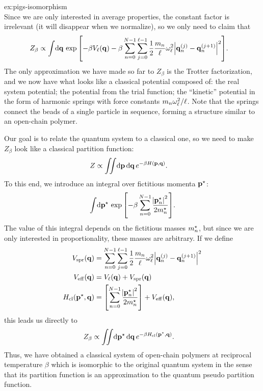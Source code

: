 \begin{DefAnswer}{ex:pigs-isomorphism}
\begin{subequations}
\end{subequations}
	Since we are only interested in average properties, the constant factor is irrelevant (it will disappear when we normalize), so we only need to claim that
	\begin{align}
		Z_\beta
		&\propto
			\int\! \dif \vec{q} \,
				\expb{
					-\beta V_\links(\vec{q})
					- \beta \sum_{n=0}^{N-1} \sum_{j=0}^{\links - 1}
						\frac{1}{2} \frac{m_n}{\links} \omega_\links^2 \abs{\vec{q}_n\bead{j} - \vec{q}_n\bead{j+1}}^2
				}.
	\end{align}
	The only approximation we have made so far to $Z_\beta$ is the Trotter factorization, and we now have what looks like a classical potential composed of: the real system potential; the potential from the trial function; the ``kinetic'' potential in the form of harmonic springs with force constants $m_n \omega_\ell^2 / \ell$.
	Note that the springs connect the beads of a single particle in sequence, forming a structure similar to an open-chain polymer.

	Our goal is to relate the quantum system to a classical one, so we need to make $Z_\beta$ look like a classical partition function:
	\begin{align}
		Z
		&\propto \iint\! \dif \vec{p} \dif \vec{q} \, e^{-\beta H(\vec{p}, \vec{q})}.
	\end{align}
	To this end, we introduce an integral over fictitious momenta ${\bm{\mathbf{p}}}^\star$:
	\begin{align}
		\int\! \dif \fict{\vec{p}} \, \expb{-\beta \sum_{n=0}^{N-1} \frac{\abs{\fict{\vec{p}}_n}^2}{2 \fict{m}_n}}.
	\end{align}
	The value of this integral depends on the fictitious masses ${m}^\star_n$, but since we are only interested in proportionality, these masses are arbitrary.
	If we define
	\begin{subequations} \label{eq:classical-equations}
	\begin{align}
		V_\mathrm{spr}(\bm{\mathbf{q}})
		&= \sum_{n=0}^{N-1} \sum_{j=0}^{\ell - 1}
			\frac{1}{2} \frac{m_n}{\ell} \omega_\ell^2
			\abs{\bm{\mathbf{q}}_n^{(j)} - \bm{\mathbf{q}}_n^{(j+1)}}^2
				\label{eq:classical-potential-spring} \\
		V_\mathrm{eff}(\bm{\mathbf{q}})
		&= V_\ell(\bm{\mathbf{q}}) + V_\mathrm{spr}(\bm{\mathbf{q}})
				\label{eq:classical-potential} \\
		H_\mathrm{cl}({\bm{\mathbf{p}}}^\star, \bm{\mathbf{q}})
		&= \left[ \sum_{n=0}^{N-1} \frac{\abs{{\bm{\mathbf{p}}}^\star_n}^2}{2 {m}^\star_n} \right] + V_\mathrm{eff}(\bm{\mathbf{q}}),
				\label{eq:classical-hamiltonian}
	\end{align}
	\end{subequations}
	this leads us directly to
	\begin{align}
		Z_\beta
		&\propto \iint\! \dif \fict{\vec{p}} \dif \vec{q} \, e^{-\beta \Hcl(\fict{\vec{p}}, \vec{q})}.
			\label{eq:classical-Z}
	\end{align}
	Thus, we have obtained a classical system of open-chain polymers at reciprocal temperature $\beta$ which is isomorphic to the original quantum system in the sense that its partition function is an approximation to the quantum pseudo partition function.


\end{DefAnswer}
